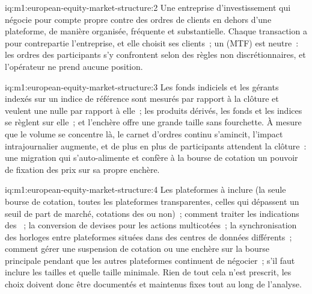 \begin{solution}{iq:m1:european-equity-market-structure:2}
Une entreprise d'investissement qui négocie pour compte propre contre des ordres de clients en dehors d'une
plateforme, de manière organisée, fréquente et substantielle. Chaque transaction a pour
contrepartie l'entreprise, et elle choisit ses clients~; un  (MTF) est neutre~: les ordres des participants s'y confrontent selon des
règles non discrétionnaires, et l'opérateur ne prend aucune position.
\end{solution}

\begin{solution}{iq:m1:european-equity-market-structure:3}
Les fonds indiciels et les gérants indexés sur un indice de référence sont mesurés par rapport à la clôture et veulent
une  nulle par rapport à elle~; les produits dérivés, les fonds et les indices se règlent sur elle~;
et l'enchère offre une grande taille sans fourchette. À mesure que le volume se concentre
là, le carnet d'ordres continu s'amincit, l'impact intrajournalier augmente, et
de plus en plus de participants attendent la clôture~: une migration qui s'auto-alimente et
confère à la bourse de cotation un pouvoir de fixation des prix sur sa propre enchère.
\end{solution}

\begin{solution}{iq:m1:european-equity-market-structure:4}
Les plateformes à inclure (la seule bourse de cotation, toutes les plateformes transparentes, celles qui dépassent un
seuil de part de marché, cotations des  ou non)~; comment
traiter les indications des ~; la conversion de devises pour les actions
multicotées~; la synchronisation des horloges entre plateformes situées dans des centres de données différents~; comment
gérer une suspension de cotation ou une enchère sur la bourse principale pendant que les autres plateformes continuent de négocier~;
s'il faut inclure les tailles et quelle taille minimale. Rien de tout cela n'est prescrit,
les choix doivent donc être documentés et maintenus fixes tout au long de l'analyse.
\end{solution}

